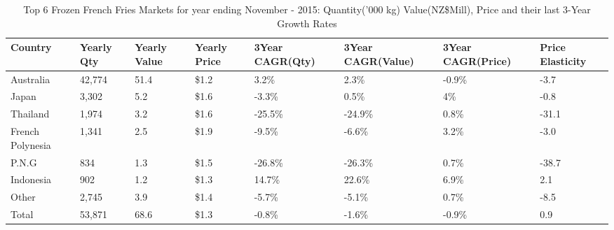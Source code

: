 \begin{table}[ht]
\centering
{\scriptsize
\begin{tabular}[t]{p{1.8cm}>{\hfill}p{1.4cm}>{\hfill}p{1.4cm}>{\hfill}p{1.6cm}>{\hfill}p{1.9cm}>{\hfill}p{2cm}>{\hfill}p{1.9cm}>{\hfill}p{1.5cm}}
 \textbf{Country} & \textbf{Yearly Qty} & \textbf{Yearly Value} & \textbf{Yearly Price} & \textbf{3Year CAGR(Qty)} & \textbf{3Year CAGR(Value)} & \textbf{3Year CAGR(Price)} & \textbf{Price Elasticity} \\
\hline
Australia & 42,774 & 51.4 & \$1.2 & 3.2\% & 2.3\% & -0.9\% & -3.7 \\  
Japan & 3,302 & 5.2 & \$1.6 & -3.3\% & 0.5\% & 4\% & -0.8 \\  
Thailand & 1,974 & 3.2 & \$1.6 & -25.5\% & -24.9\% & 0.8\% & -31.1 \\  
French Polynesia & 1,341 & 2.5 & \$1.9 & -9.5\% & -6.6\% & 3.2\% & -3.0 \\  
P.N.G & 834 & 1.3 & \$1.5 & -26.8\% & -26.3\% & 0.7\% & -38.7 \\  
Indonesia & 902 & 1.2 & \$1.3 & 14.7\% & 22.6\% & 6.9\% & 2.1 \\  
Other & 2,745 & 3.9 & \$1.4 & -5.7\% & -5.1\% & 0.7\% & -8.5 \\  
Total & 53,871 & 68.6 & \$1.3 & -0.8\% & -1.6\% & -0.9\% & 0.9 \\  
\hline
\end{tabular}
}
\caption{\scriptsize Top 6 Frozen French Fries Markets for year ending November - 2015: Quantity('000 kg) Value(NZ\$Mill), Price and their last 3-Year Growth Rates}
\end{table}

